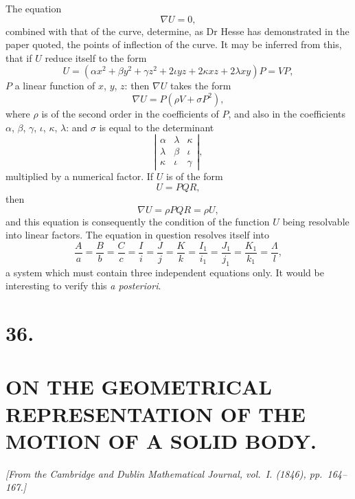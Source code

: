 \documentclass[11pt]{article}
\begin{document}
\newpage
\setcounter{page}{233}

The equation
\[
\nabla U=0,
\]
combined with that of the curve, determine, as Dr Hesse has demonstrated in the paper
quoted, the points of inflection of the curve. It may be inferred from this, that if $U$
reduce itself to the form
\[
U=(\alpha x^2+\beta y^2+\gamma z^2+2\iota yz+2\kappa xz+2\lambda xy)P=VP,\tag{22}
\]
$P$ a linear function of $x$, $y$, $z$: then $\nabla U$ takes the form
\[
\nabla U=P(\rho V+\sigma P^2),\tag{23}
\]
where $\rho$ is of the second order in the coefficients of $P$, and also in the
coefficients $\alpha$, $\beta$, $\gamma$, $\iota$, $\kappa$, $\lambda$: and $\sigma$ is equal
to the determinant
\[
\left|
\begin{array}{ccc}
\alpha&\lambda&\kappa\\
\lambda&\beta&\iota\\
\kappa&\iota&\gamma
\end{array}
\right|,\tag{24}
\]
multiplied by a numerical factor. If $U$ is of the form
\[
U=PQR,\tag{25}
\]
then
\[
\nabla U=\rho PQR=\rho U,\tag{26}
\]
and this equation is consequently the condition of the function $U$ being resolvable
into linear factors. The equation in question resolves itself into
\[
\frac{A}{a}=\frac{B}{b}=\frac{C}{c}=\frac{I}{i}=\frac{J}{j}=\frac{K}{k}
=\frac{I_1}{i_1}=\frac{J_1}{j_1}=\frac{K_1}{k_1}=\frac{\Lambda}{l},\tag{27}
\]
a system which must contain three independent equations only. It would be interesting
to verify this \textit{a posteriori}.

\newpage
\section*{36.}
\section*{ON THE GEOMETRICAL REPRESENTATION OF THE MOTION OF A SOLID BODY.}
\setcounter{page}{234}

\textit{[From the Cambridge and Dublin Mathematical Journal, vol.~I. (1846), pp.~164--167.]}
\end{document}
